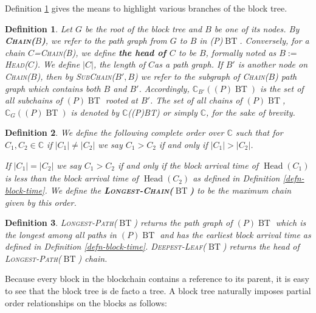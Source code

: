 \documentclass{book}
\newcommand{\assign}{:=}
\newcommand{\tmname}[1]{\textsc{#1}}
\newcommand{\tmop}[1]{\ensuremath{\operatorname{#1}}}
\newcommand{\tmstrong}[1]{\textbf{#1}}
\newtheorem{definition}{Definition}
\newtheorem{definition}{Definition}
\begin{document}
Definition \ref{defn-chain-subchain} gives the means to highlight various
branches of the block tree.

\begin{definition}
  \label{defn-chain-subchain}Let $G$ be the root of the block tree and $B$ be
  one of its nodes. By {\tmname{{\tmstrong{Chain($B$)}},}} we refer to the
  path graph from $G$ to $B$ in (P)$\tmop{BT}$. Conversely, for a chain
  $C$={\tmname{Chain(B)}}, we define {\tmstrong{the head of $C$}} to be $B$,
  formally noted as $B \assign${\tmname{Head($C$)}}. We define $| C |$, the
  length of $C$as a path graph. If $B'$ is another node on
  {\tmname{Chain($B$)}}, then by {\tmname{SubChain($B', B$)}} we refer to the
  subgraph of {\tmname{Chain($B$)}} path graph which contains both $B$ and
  $B'$. Accordingly, $\mathbb{C}_{B'} ((P) \tmop{BT})$ is the set of all
  subchains of $(P) \tmop{BT}$ rooted at $B'$. The set of all chains of $(P)
  \tmop{BT}$, $\mathbb{C}_G ((P) \tmop{BT})$ is denoted by $\mathbb{C}$((P)BT)
  or simply $\mathbb{C}$, for the sake of brevity.
\end{definition}

\begin{definition}
  \label{defn-longest-chain}We define the following complete order over
  $\mathbb{C}$ such that for $C_1, C_2 \in \mathbb{C}$ if $| C_1 | \neq | C_2
  |$ we say $C_1 > C_2$ if and only if $| C_1 | > | C_2 |$.
  
  If $| C_1 | = | C_2 |$ we say $C_1 > C_2$ if and only if the block arrival
  time of $\tmop{Head} (C_1)_{}$ is less than the block arrival time of
  $\tmop{Head} (C_2)$ as defined in Definition \ref{defn-block-time}. We
  define the {\tmstrong{{\tmname{Longest-Chain($\tmop{BT}$)}}}} to be the
  maximum chain given by this order.
\end{definition}

\begin{definition}
  {\tmname{Longest-Path($\tmop{BT}$)}} returns the path graph of $(P)
  \tmop{BT}$ which is the longest among all paths in $(P) \tmop{BT}$ and has
  the earliest block arrival time as defined in Definition
  \ref{defn-block-time}. {\tmname{Deepest-Leaf($\tmop{BT}$)}} returns the head
  of {\tmname{Longest-Path($\tmop{BT}$)}} chain.
\end{definition}

Because every block in the blockchain contains a reference to its parent, it
is easy to see that the block tree is de facto a tree. A block tree naturally
imposes partial order relationships on the blocks as follows:
\end{document}
